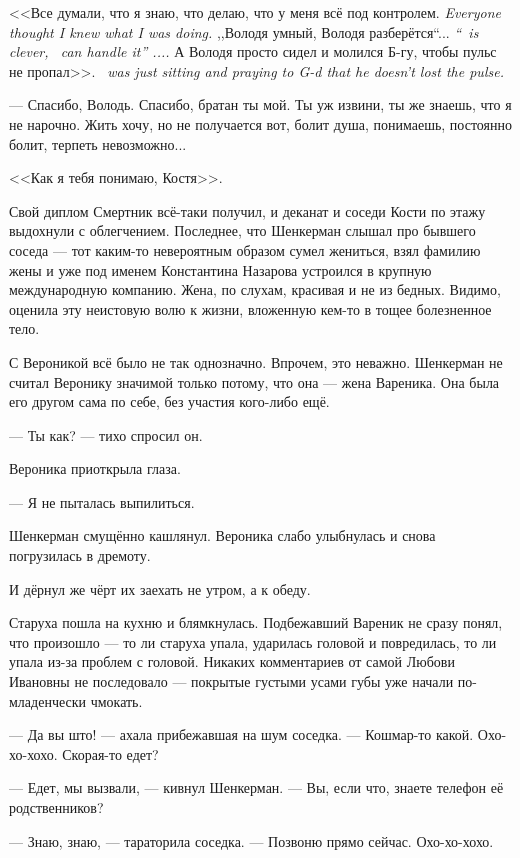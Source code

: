 {<<Все думали, что я знаю, что делаю, что у меня всё под контролем.}
{\textit{Everyone thought I knew what I was doing.}}
{,,Володя умный, Володя разберётся``...}
{\textit{``\Volodya\ is clever, \Volodya\ can handle it'' ....}}
{А Володя просто сидел и молился Б-гу, чтобы пульс не пропал>>.}
{\textit{\Volodya\ was just sitting and praying to G-d that he doesn't lost the pulse.}}

--- Спасибо, Володь.
Спасибо, братан ты мой.
Ты уж извини, ты же знаешь, что я не нарочно.
Жить хочу, но не получается вот, болит душа, понимаешь, постоянно болит, терпеть невозможно...

<<Как я тебя понимаю, Костя>>.

Свой диплом Смертник всё-таки получил, и деканат и соседи Кости по этажу выдохнули с облегчением.
Последнее, что Шенкерман слышал про бывшего соседа --- тот каким-то невероятным образом сумел жениться, взял фамилию жены и уже под именем Константина Назарова устроился в крупную международную компанию.
Жена, по слухам, красивая и не из бедных.
Видимо, оценила эту неистовую волю к жизни, вложенную кем-то в тощее болезненное тело.

С Вероникой всё было не так однозначно.
Впрочем, это неважно.
Шенкерман не считал Веронику значимой только потому, что она --- жена Вареника.
Она была его другом сама по себе, без участия кого-либо ещё.

--- Ты как? --- тихо спросил он.

Вероника приоткрыла глаза.

--- Я не пыталась выпилиться.

Шенкерман смущённо кашлянул.
Вероника слабо улыбнулась и снова погрузилась в дремоту.

\asterism

И дёрнул же чёрт их заехать не утром, а к обеду.

Старуха пошла на кухню и блямкнулась.
Подбежавший Вареник не сразу понял, что произошло --- то ли старуха упала, ударилась головой и повредилась, то ли упала из-за проблем с головой.
Никаких комментариев от самой Любови Ивановны не последовало --- покрытые густыми усами губы уже начали по-младенчески чмокать.

--- Да вы што! --- ахала прибежавшая на шум соседка.
--- Кошмар-то какой.
Охо-хо-хохо.
Скорая-то едет?

--- Едет, мы вызвали, --- кивнул Шенкерман.
--- Вы, если что, знаете телефон её родственников?

--- Знаю, знаю, --- тараторила соседка.
--- Позвоню прямо сейчас.
Охо-хо-хохо.

